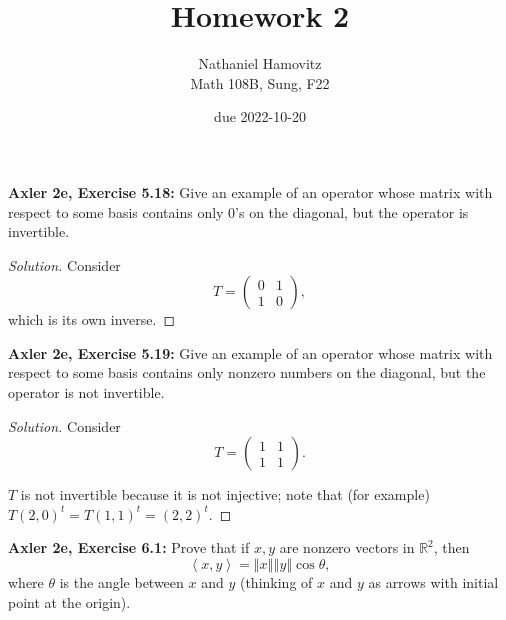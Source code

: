 \documentclass{article}
\newcommand{\R}{\mathbb{R}}
\newcommand{\norm}[1]{\left\Vert #1 \right\Vert}
\newcommand{\iprod}[2]{\left\langle #1, #2 \right\rangle}
\begin{document}


\title{Homework 2} %
\author{Nathaniel Hamovitz\\Math 108B, Sung, F22}
\date{due 2022-10-20}

\maketitle



\textbf{Axler 2e, Exercise 5.18: } %
Give an example of an operator whose matrix with respect to some basis contains only 0's on the diagonal, but the operator is invertible.

\begin{proof}[Solution]
    Consider
    $$T = \begin{pmatrix}
        0 & 1 \\
        1 & 0
    \end{pmatrix},$$
    which is its own inverse.
\end{proof}


\newpage %


\textbf{Axler 2e, Exercise 5.19: } %
Give an example of an operator whose matrix with respect to some basis contains only nonzero numbers on the diagonal, but the operator is not invertible. 

\begin{proof}[Solution]
    Consider $$T = \begin{pmatrix}
        1 & 1 \\
        1 & 1
    \end{pmatrix}.$$

    $T$ is not invertible because it is not injective; note that (for example) $T(2, 0)^t = T(1, 1)^t = (2, 2)^t$.    
\end{proof}


\newpage %


\textbf{Axler 2e, Exercise 6.1: }
Prove that if $x, y$ are nonzero vectors in $\R^2$, then
$$\iprod{x}{y} = \norm{x} \norm{y} \cos \theta,$$
where $\theta$ is the angle between $ x$ and $y$ (thinking of $x$ and $y$ as arrows with initial point at the origin).
\end{document}
